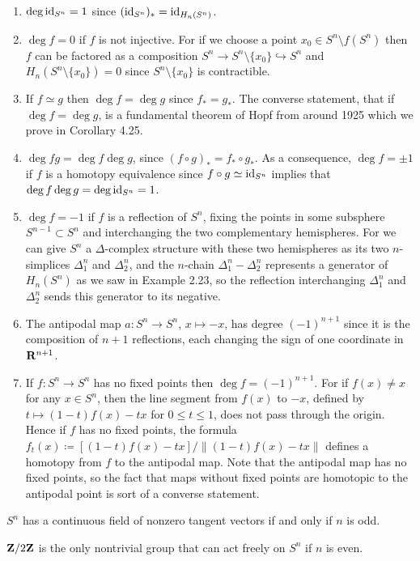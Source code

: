 \begin{enumerate}[label=(\arabic*)]
\item $\deg\operatorname{id}_{S^n}=1$ since $(\operatorname{id}_{S^n})_*=\operatorname{id}_{H_n(S^n)}$.
\item $\deg f=0$ if $f$ is not injective. For if we choose a point $x_0\in
  S^n\setminus f(S^n)$ then $f$ can be factored as a composition $S^n\to
  S^n\setminus\{x_0\}\hookrightarrow S^n$ and $H_n(S^n\setminus\{x_0\})=0$ since
  $S^n\setminus\{x_0\}$ is contractible.
\item If $f\simeq g$ then $\deg f=\deg g$ since $f_*=g_*$. The converse
  statement, that if $\deg f=\deg g$, is a fundamental theorem of Hopf from
  around 1925 which we prove in Corollary 4.25.
\item $\deg fg=\deg f\deg g$, since $(f\circ g)_*=f_*\circ g_*$. As a
  consequence, $\deg f=\pm 1$ if $f$ is a homotopy equivalence since
  $f\circ g\simeq \operatorname{id}_{S^n}$ implies that $\deg f\deg g=\deg\operatorname{id}_{S^n}=1$.
\item $\deg f=-1$ if $f$ is a reflection of $S^n$, fixing the points in
  some subsphere $S^{n-1}\subset S^n$ and interchanging the two
  complementary hemispheres. For we can give $S^n$ a $\Delta$-complex
  structure with these two hemispheres as its two $n$-simplices
  $\Delta_1^n$ and $\Delta_2^n$, and the $n$-chain $\Delta_1^n-\Delta_2^n$
  represents a generator of $H_n(S^n)$ as we saw in Example 2.23, so the
  reflection interchanging $\Delta_1^n$ and $\Delta_2^n$ sends this
  generator to its negative.
\item The antipodal map $a\colon S^n\to S^n$, $x\mapsto -x$, has degree
  $(-1)^{n+1}$ since it is the composition of $n+1$ reflections, each
  changing the sign of one coordinate in $\mathbf{R}^{n+1}$.
\item If $f\colon S^n\to S^n$ has no fixed points then $\deg
  f=(-1)^{n+1}$. For if $f(x)\neq x$ for any $x\in S^n$, then the line
  segment from $f(x)$ to $-x$, defined by $t\mapsto(1-t)f(x)-tx$ for $0\leq
  t\leq 1$, does not pass through the origin. Hence if $f$ has no fixed
  points, the formula $f_t(x)\coloneqq[(1-t)f(x)-tx]/\|(1-t)f(x)-tx\|$
  defines a homotopy from $f$ to the antipodal map. Note that the antipodal
  map has no fixed points, so the fact that maps without fixed points are
  homotopic to the antipodal point is sort of a converse statement.
\end{enumerate}
\begin{theorem}[2.8]
$S^n$ has a continuous field of nonzero tangent vectors if and only if $n$
is odd.
\end{theorem}
\begin{proposition*}[2.29]
$\mathbf{Z}/2\mathbf{Z}$ is the only nontrivial group that can act freely on $S^n$ if
$n$ is even.
\end{proposition*}

